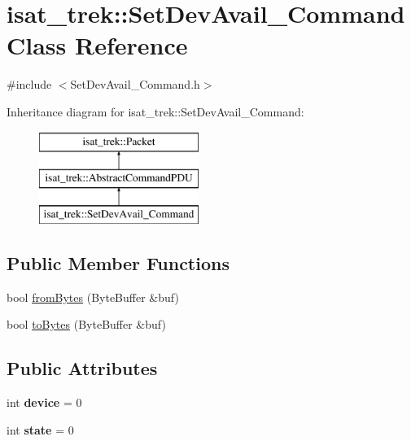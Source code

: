 \hypertarget{classisat__trek_1_1_set_dev_avail___command}{}\section{isat\+\_\+trek\+:\+:Set\+Dev\+Avail\+\_\+\+Command Class Reference}
\label{classisat__trek_1_1_set_dev_avail___command}


{\ttfamily \#include $<$Set\+Dev\+Avail\+\_\+\+Command.\+h$>$}

Inheritance diagram for isat\+\_\+trek\+:\+:Set\+Dev\+Avail\+\_\+\+Command\+:\begin{figure}[H]
\begin{center}
\leavevmode
\includegraphics[height=3.000000cm]{classisat__trek_1_1_set_dev_avail___command}
\end{center}
\end{figure}
\subsection*{Public Member Functions}
\begin{DoxyCompactItemize}
\item 
bool \hyperlink{classisat__trek_1_1_set_dev_avail___command_a41c65b9d92d15530c3714523d95f052f}{from\+Bytes} (Byte\+Buffer \&buf)
\item 
bool \hyperlink{classisat__trek_1_1_set_dev_avail___command_a81fdec7886aaa46a16ec318a56f76801}{to\+Bytes} (Byte\+Buffer \&buf)
\end{DoxyCompactItemize}
\subsection*{Public Attributes}
\begin{DoxyCompactItemize}
\item 
int {\bfseries device} = 0\hypertarget{classisat__trek_1_1_set_dev_avail___command_aef0511b825179928d6b3d9784e0bf98f}{}\label{classisat__trek_1_1_set_dev_avail___command_aef0511b825179928d6b3d9784e0bf98f}

\item 
int {\bfseries state} = 0\hypertarget{classisat__trek_1_1_set_dev_avail___command_a385aa636f92971e5d9bd708561e07210}{}\label{classisat__trek_1_1_set_dev_avail___command_a385aa636f92971e5d9bd708561e07210}

\end{DoxyCompactItemize}


